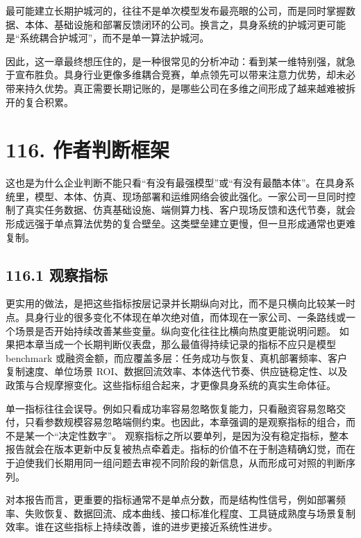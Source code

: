 最可能建立长期护城河的，往往不是单次模型发布最亮眼的公司，而是同时掌握数据、本体、基础设施和部署反馈闭环的公司。换言之，具身系统的护城河更可能是“系统耦合护城河”，而不是单一算法护城河。

因此，这一章最终想压住的，是一种很常见的分析冲动：看到某一维特别强，就急于宣布胜负。具身行业更像多维耦合竞赛，单点领先可以带来注意力优势，却未必带来持久优势。真正需要长期记账的，是哪些公司在多维之间形成了越来越难被拆开的复合积累。

\section*{116. 作者判断框架}

这也是为什么企业判断不能只看“有没有最强模型”或“有没有最酷本体”。在具身系统里，模型、本体、仿真、现场部署和运维网络会彼此强化。一家公司一旦同时控制了真实任务数据、仿真基础设施、端侧算力栈、客户现场反馈和迭代节奏，就会形成远强于单点算法优势的复合壁垒。这类壁垒建立更慢，但一旦形成通常也更难复制。

\subsection*{116.1 观察指标}


更实用的做法，是把这些指标按层记录并长期纵向对比，而不是只横向比较某一时点。具身行业的很多变化不体现在单次绝对值，而体现在一家公司、一条路线或一个场景是否开始持续改善某些变量。纵向变化往往比横向热度更能说明问题。 如果把本章当成一个长期判断仪表盘，那么最值得持续记录的指标不应只是模型 benchmark 或融资金额，而应覆盖多层：任务成功与恢复、真机部署频率、客户复制速度、单位场景 ROI、数据回流效率、本体迭代节奏、供应链稳定性、以及政策与合规摩擦变化。这些指标组合起来，才更像具身系统的真实生命体征。

单一指标往往会误导。例如只看成功率容易忽略恢复能力，只看融资容易忽略交付，只看参数规模容易忽略端侧约束。也因此，本章强调的是观察指标的组合，而不是某一个“决定性数字”。 观察指标之所以要单列，是因为没有稳定指标，整本报告就会在版本更新中反复被热点牵着走。指标的价值不在于制造精确幻觉，而在于迫使我们长期用同一组问题去审视不同阶段的新信息，从而形成可对照的判断序列。

对本报告而言，更重要的指标通常不是单点分数，而是结构性信号，例如部署频率、失败恢复、数据回流、成本曲线、接口标准化程度、工具链成熟度与场景复制效率。谁在这些指标上持续改善，谁的进步更接近系统性进步。

